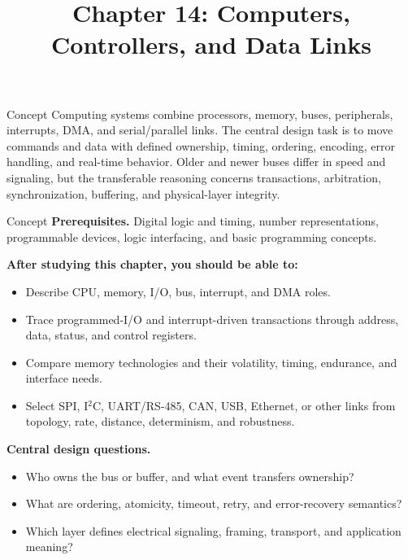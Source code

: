 \documentclass[10pt,letterpaper]{article}
\title{Chapter 14: Computers, Controllers, and Data Links}
\author{}
\date{}
\begin{document}
\maketitle

\begin{CornellOverviewBox}{Concept}
Computing systems combine processors, memory, buses, peripherals, interrupts, DMA, and serial/parallel links. The central design task is to move commands and data with defined ownership, timing, ordering, encoding, error handling, and real-time behavior. Older and newer buses differ in speed and signaling, but the transferable reasoning concerns transactions, arbitration, synchronization, buffering, and physical-layer integrity.
\end{CornellOverviewBox}
\begin{CornellOverviewBox}{Concept}
\textbf{Prerequisites.} Digital logic and timing, number representations, programmable devices, logic interfacing, and basic programming concepts.

\textbf{After studying this chapter, you should be able to:}
\begin{itemize}
  \item Describe CPU, memory, I/O, bus, interrupt, and DMA roles.
  \item Trace programmed-I/O and interrupt-driven transactions through address, data, status, and control registers.
  \item Compare memory technologies and their volatility, timing, endurance, and interface needs.
  \item Select SPI, I$^2$C, UART/RS-485, CAN, USB, Ethernet, or other links from topology, rate, distance, determinism, and robustness.
\end{itemize}\textbf{Central design questions.}
\begin{itemize}
  \item Who owns the bus or buffer, and what event transfers ownership?
  \item What are ordering, atomicity, timeout, retry, and error-recovery semantics?
  \item Which layer defines electrical signaling, framing, transport, and application meaning?
\end{itemize}\end{CornellOverviewBox}
\end{document}
